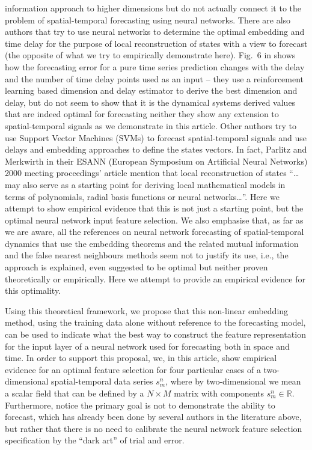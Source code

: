 \documentclass[journal]{IEEEtran}
\begin{document}
information approach to higher dimensions but do not actually connect it to the problem of spatial-temporal forecasting using neural networks. 
There are also authors \cite{articleRagulskis} that try to use neural networks to determine the optimal embedding and time 
delay for the purpose of local reconstruction of states with a view to forecast (the opposite of what we try to empirically demonstrate 
here). Fig.\ 6 in \cite{1555956} shows how the forecasting error for a pure time series prediction changes with the delay and the number of 
time delay points used as an input -- they use a reinforcement learning based dimension and delay estimator to derive the best dimension 
and delay, but do not seem to show that it is the dynamical systems derived values that are indeed optimal for forecasting neither
they show any extension to spatial-temporal signals as we demonstrate in this article.
Other authors \cite{Xia2006APF} try to use Support Vector Machines (SVMs) to forecast spatial-temporal signals and use delays and 
embedding approaches to define the states vectors. In fact, Parlitz and Merkwirth \cite{Parlitz2000NonlinearPO} in their
ESANN (European Symposium on Artificial Neural Networks) 2000 meeting proceedings' article mention
 that local reconstruction of states ``\ldots may also serve as
a starting point for deriving local mathematical models in terms of polynomials,
radial basis functions or neural networks\ldots''. Here we attempt to show empirical evidence that this is not just
a starting point, but the optimal neural network input feature selection. We also emphasise that,
 as far as we are aware, all the references on neural network forecasting of spatial-temporal dynamics that use the 
embedding theorems and the related mutual information and the false nearest neighbours methods seem not to justify its use, i.e., 
the approach is explained, even suggested to be optimal but neither proven theoretically or empirically. Here we attempt 
to provide an empirical evidence for this optimality. 

Using this theoretical framework, we propose that this non-linear 
embedding method, using the training data alone without reference to the forecasting model, 
can be used to indicate what the best way to construct the feature representation for 
the input layer of a neural network used for forecasting both in space and time.
In order to support this proposal, we, in this article, show empirical evidence for an optimal feature selection 
 for four particular cases of a two-dimensional
spatial-temporal data series $s^n_m$, where by two-dimensional we mean a scalar field that can be
defined by a $N \times M$ matrix with components $s^n_m \in \mathbb{R}$. Furthermore, notice the primary goal is not to demonstrate 
the ability to forecast, which has already been done by several authors in the literature above, but rather that there is no need to calibrate
the neural network feature selection specification by the ``dark art'' of trial and error.
 
\end{document}
